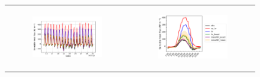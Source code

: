 \begin{figure}[hbtp]
\begin{tabular}{cc}
        \begin{subfigure}[t]{0.5\textwidth}
            \caption{}
            \includegraphics[width=\textwidth]{images/chap5/SOP_TS_DC/time_series_cendrosa_sens.png}
        \end{subfigure} &
        \begin{subfigure}[t]{0.5\textwidth}
            \caption{}
            \includegraphics[width=\textwidth]{images/chap5/SOP_TS_DC/diurnal_cycle_cendrosa_sens.png}
        \end{subfigure} \\


\end{tabular}
\end{figure}

